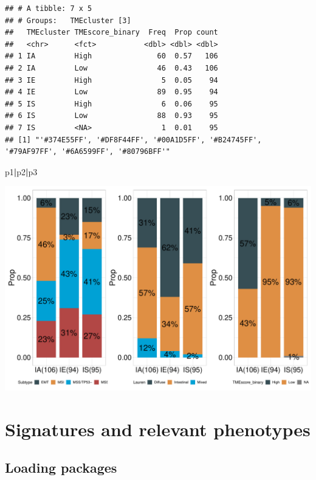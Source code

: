 \documentclass[
  12pt,
]{book}
\newenvironment{Shaded}{\begin{snugshade}}{\end{snugshade}}
\newcommand{\NormalTok}[1]{#1}
\newcommand{\SpecialCharTok}[1]{\textcolor[rgb]{0.81,0.36,0.00}{\textbf{#1}}}
\theoremstyle{definition}
\theoremstyle{definition}
\theoremstyle{definition}
\theoremstyle{definition}
\theoremstyle{remark}
\begin{document}
\begin{verbatim}
## # A tibble: 7 x 5
## # Groups:   TMEcluster [3]
##   TMEcluster TMEscore_binary  Freq  Prop count
##   <chr>      <fct>           <dbl> <dbl> <dbl>
## 1 IA         High               60  0.57   106
## 2 IA         Low                46  0.43   106
## 3 IE         High                5  0.05    94
## 4 IE         Low                89  0.95    94
## 5 IS         High                6  0.06    95
## 6 IS         Low                88  0.93    95
## 7 IS         <NA>                1  0.01    95
## [1] "'#374E55FF', '#DF8F44FF', '#00A1D5FF', '#B24745FF', '#79AF97FF', '#6A6599FF', '#80796BFF'"
\end{verbatim}

\begin{Shaded}
\begin{Highlighting}[]
\NormalTok{p1}\SpecialCharTok{|}\NormalTok{p2}\SpecialCharTok{|}\NormalTok{p3}
\end{Highlighting}
\end{Shaded}

\includegraphics{_main_files/figure-latex/unnamed-chunk-27-1.pdf}

\hypertarget{signatures-and-relevant-phenotypes}{%
\chapter{Signatures and relevant phenotypes}\label{signatures-and-relevant-phenotypes}}

\hypertarget{loading-packages}{%
\section{Loading packages}\label{loading-packages}}
\end{document}
